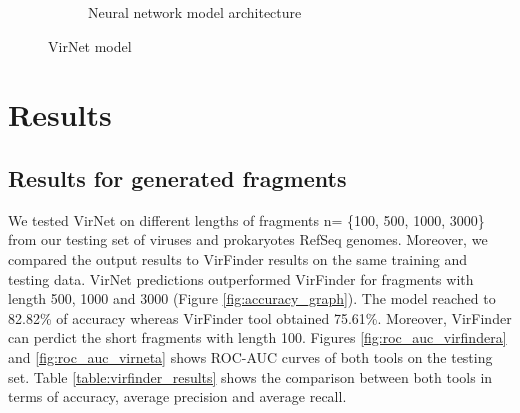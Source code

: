 \documentclass[10pt,journal,compsoc]{IEEEtran}
\begin{document}
\begin{figure}[!htbp]
\begin{subfigure}{0.4\textwidth}
		\caption{Neural network model architecture} 
		\label{fig:model_diagram}
	\end{subfigure}
	\caption{VirNet model} 
	\label{fig:model_arch}
\end{figure}

\section{Results}

\subsection{Results for generated fragments}
We tested VirNet on different lengths of fragments n= \{100, 500, 1000, 3000\} from our testing set of viruses and prokaryotes RefSeq genomes. Moreover, we compared the output results to VirFinder results on the same training and testing data. VirNet predictions outperformed VirFinder for fragments with length 500, 1000 and 3000 (Figure \ref{fig:accuracy_graph}). The model reached to 82.82\% of accuracy whereas VirFinder tool obtained 75.61\%. Moreover, VirFinder can perdict the short fragments with length 100. Figures \ref{fig:roc_auc_virfindera} and \ref{fig:roc_auc_virneta} shows ROC-AUC curves of both tools on the testing set. Table \ref{table:virfinder_results} shows the comparison between both tools in terms of accuracy, average precision and average recall.

\end{document}
